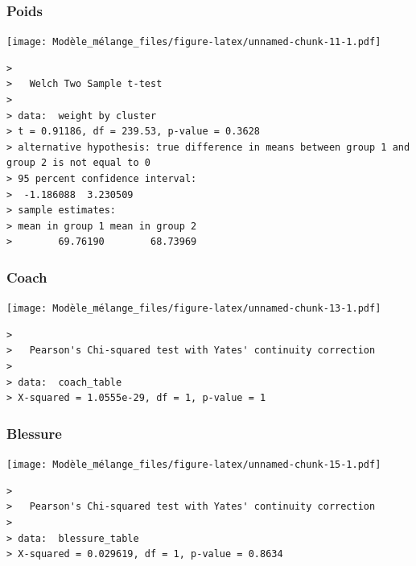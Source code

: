 \documentclass[
]{article}
\let\origfigure\figure
\let\endorigfigure\endfigure
\renewenvironment{figure}[1][2]{
    \expandafter\origfigure\expandafter[H]
} {
    \endorigfigure
}
\begin{document}
\hypertarget{poids}{%
\subsubsection{Poids}\label{poids}}

\begin{figure}
\centering
\texttt{[image: Modèle\_mélange\_files/figure-latex/unnamed-chunk-11-1.pdf]}
\caption{Distribution du poids par groupe}
\end{figure}

\begin{verbatim}
> 
>   Welch Two Sample t-test
> 
> data:  weight by cluster
> t = 0.91186, df = 239.53, p-value = 0.3628
> alternative hypothesis: true difference in means between group 1 and group 2 is not equal to 0
> 95 percent confidence interval:
>  -1.186088  3.230509
> sample estimates:
> mean in group 1 mean in group 2 
>        69.76190        68.73969
\end{verbatim}

\hypertarget{coach}{%
\subsubsection{Coach}\label{coach}}

\begin{figure}
\centering
\texttt{[image: Modèle\_mélange\_files/figure-latex/unnamed-chunk-13-1.pdf]}
\caption{Répartition des coureurs ayant des coachs par groupe}
\end{figure}

\begin{verbatim}
> 
>   Pearson's Chi-squared test with Yates' continuity correction
> 
> data:  coach_table
> X-squared = 1.0555e-29, df = 1, p-value = 1
\end{verbatim}

\hypertarget{blessure}{%
\subsubsection{Blessure}\label{blessure}}

\begin{figure}
\centering
\texttt{[image: Modèle\_mélange\_files/figure-latex/unnamed-chunk-15-1.pdf]}
\caption{Répartition des coureurs ayant eu une blessure par groupe}
\end{figure}

\begin{verbatim}
> 
>   Pearson's Chi-squared test with Yates' continuity correction
> 
> data:  blessure_table
> X-squared = 0.029619, df = 1, p-value = 0.8634
\end{verbatim}
\end{document}
